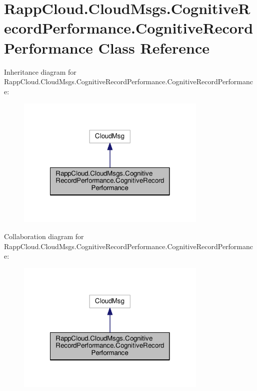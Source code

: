 \hypertarget{classRappCloud_1_1CloudMsgs_1_1CognitiveRecordPerformance_1_1CognitiveRecordPerformance}{\section{Rapp\-Cloud.\-Cloud\-Msgs.\-Cognitive\-Record\-Performance.\-Cognitive\-Record\-Performance Class Reference}
\label{classRappCloud_1_1CloudMsgs_1_1CognitiveRecordPerformance_1_1CognitiveRecordPerformance}
}


Inheritance diagram for Rapp\-Cloud.\-Cloud\-Msgs.\-Cognitive\-Record\-Performance.\-Cognitive\-Record\-Performance\-:
\nopagebreak
\begin{figure}[H]
\begin{center}
\leavevmode
\includegraphics[width=258pt]{classRappCloud_1_1CloudMsgs_1_1CognitiveRecordPerformance_1_1CognitiveRecordPerformance__inherit__graph}
\end{center}
\end{figure}


Collaboration diagram for Rapp\-Cloud.\-Cloud\-Msgs.\-Cognitive\-Record\-Performance.\-Cognitive\-Record\-Performance\-:
\nopagebreak
\begin{figure}[H]
\begin{center}
\leavevmode
\includegraphics[width=258pt]{classRappCloud_1_1CloudMsgs_1_1CognitiveRecordPerformance_1_1CognitiveRecordPerformance__coll__graph}
\end{center}
\end{figure}
